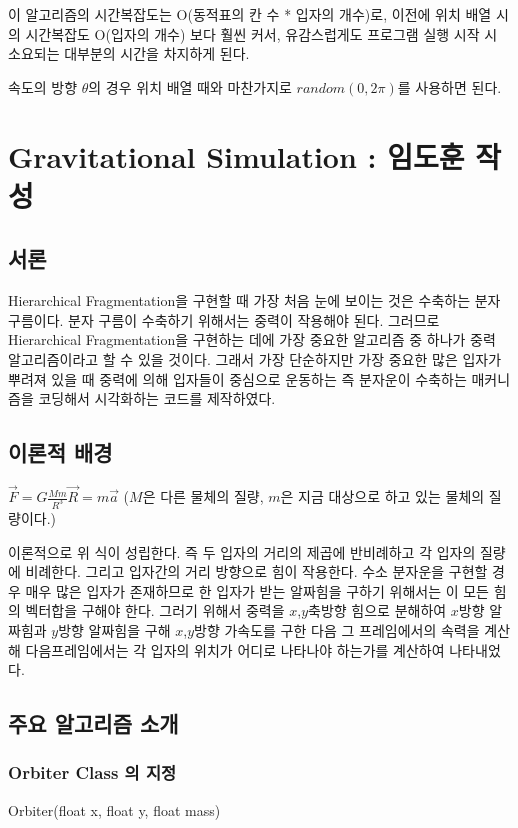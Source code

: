 \documentclass{gshs-hutech}
\begin{document}
이 알고리즘의 시간복잡도는 O(동적표의 칸 수 * 입자의 개수)로, 이전에 위치 배열 시의 시간복잡도 O(입자의 개수) 보다 훨씬 커서, 유감스럽게도 프로그램 실행 시작 시 소요되는 대부분의 시간을 차지하게 된다. 

속도의 방향 $\theta$의 경우 위치 배열 때와 마찬가지로 $random(0,2\pi)$를 사용하면 된다.


\section{Gravitational Simulation : 임도훈 작성} \label{gravity}
\subsection{서론}

Hierarchical Fragmentation을 구현할 때 가장 처음 눈에 보이는 것은 수축하는 분자 구름이다. 분자 구름이 수축하기 위해서는 중력이 작용해야 된다. 그러므로 Hierarchical Fragmentation을 구현하는 데에 가장 중요한 알고리즘 중 하나가 중력 알고리즘이라고 할 수 있을 것이다. 그래서 가장 단순하지만 가장 중요한 많은 입자가 뿌려져 있을 때 중력에 의해 입자들이 중심으로 운동하는 즉 분자운이 수축하는 매커니즘을 코딩해서 시각화하는 코드를 제작하였다.
 

\subsection{이론적 배경}

$\vec{F} = G \frac{Mm}{R^3} \vec{R} = m\vec{a}$
($M$은 다른 물체의 질량, $m$은 지금 대상으로 하고 있는 물체의 질량이다.)

이론적으로 위 식이 성립한다. 즉 두 입자의 거리의 제곱에 반비례하고 각 입자의 질량에 비례한다. 그리고 입자간의 거리 방향으로 힘이 작용한다. 수소 분자운을 구현할 경우 매우 많은 입자가 존재하므로 한 입자가 받는 알짜힘을 구하기 위해서는 이 모든 힘의 벡터합을 구해야 한다. 그러기 위해서 중력을 $x$,$y$축방향 힘으로 분해하여 $x$방향 알짜힘과 $y$방향 알짜힘을 구해 $x$,$y$방향 가속도를 구한 다음 그 프레임에서의 속력을 계산해 다음프레임에서는 각 입자의 위치가 어디로 나타나야 하는가를 계산하여 나타내었다. 

\subsection{주요 알고리즘 소개}

\subsubsection{Orbiter Class 의 지정}
Orbiter(float x, float y, float mass)
\end{document}
